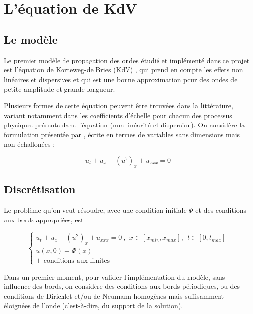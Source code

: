\section{L'équation de KdV}
\label{sec:KdV}

\subsection{Le modèle}

\indent Le premier modèle de propagation des ondes étudié et implémenté dans ce projet est l'équation de Korteweg-de Bries (KdV) , qui prend en compte les effets non linéaires et dispersives et qui est une bonne approximation pour des ondes de petite amplitude et grande longueur. \cite{BBM1971}

 \indent Plusieurs formes de cette équation peuvent être trouvées dans la littérature, variant notamment dans les coefficients d'échelle pour chacun des processus physiques présents dans l'équation (non linéarité et dispersion). On considère la formulation présentée par \cite{BBM1971}, écrite en termes de variables sans dimensions mais non échallonées : 

\begin{equation}
	\label{eq:KdVequation}
    u_t + u_x + (u^2)_x + u_{xxx} = 0
\end{equation}

\subsection{Discrétisation}

\indent Le problème qu'on veut résoudre, avec une condition initiale $\Phi$ et des conditions aux bords appropriées, est

\begin{equation*}
\begin{cases}
    u_t + u_x + (u^2)_x + u_{xxx} = 0 \ , \ \ x \in [x_{min},x_{max}], \ \ t \in [0, t_{max}] \\
    u(x,0) = \Phi(x) \\
    \text{+ conditions aux limites}
\end{cases}
\end{equation*}

\indent Dans un premier moment, pour valider l'implémentation du modèle, sans influence des bords, on considère des conditions aux bords périodiques, ou des conditions de Dirichlet et/ou de Neumann homogènes mais suffisamment éloignées de l'onde (c'est-à-dire, du support de la solution).

